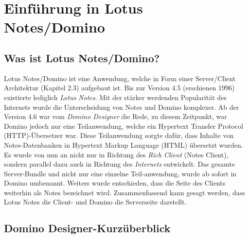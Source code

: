 \chapter{Einführung in Lotus Notes/Domino}


\section{Was ist Lotus Notes/Domino?}
\label{sec:2allgemein}

Lotus Notes/Domino ist eine Anwendung, welche in Form einer Server/Client Architektur (Kapitel 2.3) aufgebaut ist. 
Bis zur Version 4.5 (erschienen 1996) existierte lediglich \textit{Lotus \linebreak Notes}. Mit der stärker werdenden Popularität des Internets wurde die
 Unterscheidung von Notes und Domino komplexer. 
Ab der Version 4.6 war vom \emph{Domino Designer} die Rede, zu 
diesem Zeitpunkt, war Domino jedoch nur eine Teilanwendung, welche ein Hypertext \linebreak Transfer Protocol (HTTP)-Übersetzer war. 
Diese Teilanwendung sorgte dafür, dass Inhalte von Notes-Datenbanken in Hypertext Markup Language (HTML) übersetzt wurden. 
Es wurde von nun an nicht nur in Richtung des \textit{Rich Client} (Notes Client), sondern parallel dazu auch in \linebreak Richtung des \textit{Internets}
entwickelt. 
Das gesamte Server-Bundle und nicht nur eine einzelne Teil-\linebreak anwendung, wurde ab sofort in Domino umbenannt.
Weiters wurde entschieden, dass die Seite des Clients weiterhin als Notes bezeichnet wird.
Zusammenfassend kann gesagt werden, dass Lotus Notes die Client- und Domino die Serverseite darstellt\cite{knaepper}. 

\vspace{1cm}



\section{Domino Designer-Kurzüberblick}
\label{sec:2allgemein}

